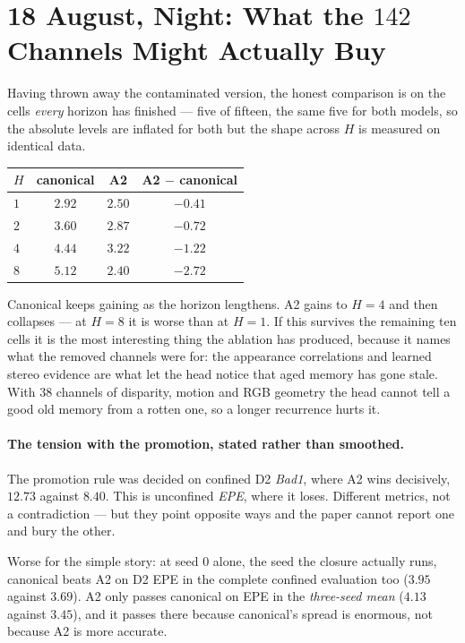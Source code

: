 \documentclass[11pt,a4paper]{article}
\begin{document}
\section*{18 August, Night: What the $142$ Channels Might Actually Buy}

Having thrown away the contaminated version, the honest comparison is on the
cells \emph{every} horizon has finished --- five of fifteen, the same five for
both models, so the absolute levels are inflated for both but the shape across
$H$ is measured on identical data.

\begin{center}
\begin{tabular}{lccc}
\toprule
$H$ & canonical & A2 & A2 $-$ canonical \\
\midrule
$1$ & $2.92$ & $2.50$ & $-0.41$ \\
$2$ & $3.60$ & $2.87$ & $-0.72$ \\
$4$ & $4.44$ & $3.22$ & $-1.22$ \\
$8$ & $5.12$ & $2.40$ & $-2.72$ \\
\bottomrule
\end{tabular}
\end{center}

Canonical keeps gaining as the horizon lengthens. A2 gains to $H{=}4$ and then
collapses --- at $H{=}8$ it is worse than at $H{=}1$. If this survives the
remaining ten cells it is the most interesting thing the ablation has produced,
because it names what the removed channels were for: the appearance correlations
and learned stereo evidence are what let the head notice that aged memory has
gone stale. With $38$ channels of disparity, motion and RGB geometry the head
cannot tell a good old memory from a rotten one, so a longer recurrence hurts it.

\paragraph{The tension with the promotion, stated rather than smoothed.}
The promotion rule was decided on confined D2 \emph{Bad1}, where A2 wins
decisively, $12.73$ against $8.40$. This is unconfined \emph{EPE}, where it
loses. Different metrics, not a contradiction --- but they point opposite ways
and the paper cannot report one and bury the other.

Worse for the simple story: at seed $0$ alone, the seed the closure actually
runs, canonical beats A2 on D2 EPE in the complete confined evaluation too
($3.95$ against $3.69$). A2 only passes canonical on EPE in the \emph{three-seed
mean} ($4.13$ against $3.45$), and it passes there because canonical's spread is
enormous, not because A2 is more accurate.
\end{document}
